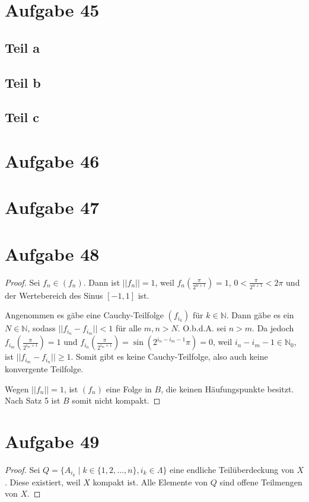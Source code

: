 \documentclass[10pt,a4paper]{article}
\begin{document}
\section{Aufgabe 45}

\subsection{Teil a}

\subsection{Teil b}

\subsection{Teil c}

\section{Aufgabe 46}

\section{Aufgabe 47}

\section{Aufgabe 48}

\begin{proof}
  Sei $f_{n} \in (f_{n})$.
  Dann ist $||f_{n}|| = 1$, weil $f_{n}(\frac{\pi}{2^{n + 1}}) = 1$, $0 < \frac{\pi}{2^{n + 1}} < 2\pi$ und der Wertebereich des Sinus $[-1, 1]$ ist.

  Angenommen es gäbe eine Cauchy-Teilfolge $(f_{i_{k}})$ für $k \in \mathbb{N}$.
  Dann gäbe es ein $N \in \mathbb{N}$, sodass $||f_{i_{n}} - f_{i_{m}}|| < 1$ für alle $m, n > N$.
  O.b.d.A. sei $n > m$.
  Da jedoch $f_{i_{m}}(\frac{\pi}{2^{i_{m} + 1}}) = 1$ und $f_{i_{n}}(\frac{\pi}{2^{i_{m} + 1}}) = \sin(2^{i_{n} - i_{m} - 1}\pi) = 0$, weil $i_{n} - i_{m} - 1 \in \mathbb{N}_{0}$, ist $||f_{i_{m}} - f_{i_{n}}|| \ge 1$.
  Somit gibt es keine Cauchy-Teilfolge, also auch keine konvergente Teilfolge.

  Wegen $||f_{n}|| = 1$, ist $(f_{n})$ eine Folge in $B$, die keinen Häufungspunkte besitzt.
  Nach Satz 5 ist $B$ somit nicht kompakt.
\end{proof}

\section{Aufgabe 49}

\begin{proof}
  Sei $Q = \{ A_{i_{k}} \mid k \in \{ 1, 2, \dots, n \}, i_{k} \in \Lambda \}$ eine endliche Teilüberdeckung von $X$.
  Diese existiert, weil $X$ kompakt ist.
  Alle Elemente von $Q$ sind offene Teilmengen von $X$.
\end{proof}
\end{document}
